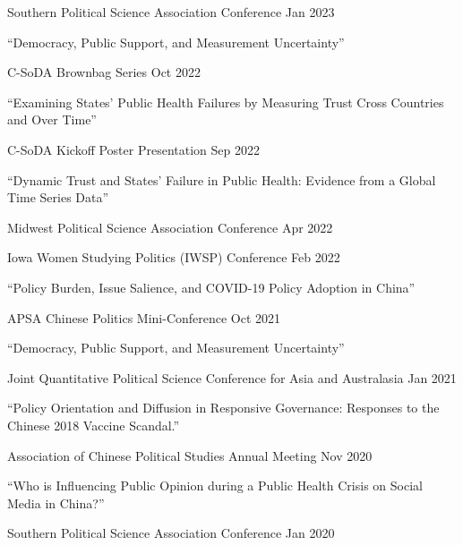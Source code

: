 \documentclass[10.5pt,]{article}
\providecommand{\tightlist}{%
	\setlength{\itemsep}{0pt}\setlength{\parskip}{0pt}}
\renewenvironment{itemize}{
	\begin{list}{}{
			\setlength{\leftmargin}{1.5em}
		}
	}{
	\end{list}
}
\begin{document}
\begin{itemize}
  \begin{itemize}
  \tightlist
  \item
    Southern Political Science Association Conference \hfill Jan 2023
  \end{itemize}
\item
  ``Democracy, Public Support, and Measurement Uncertainty''

  \begin{itemize}
  \tightlist
  \item
    C-SoDA Brownbag Series \hfill Oct 2022
  \end{itemize}
\item
  ``Examining States' Public Health Failures by Measuring Trust Cross
  Countries and Over Time''

  \begin{itemize}
  \tightlist
  \item
    C-SoDA Kickoff Poster Presentation \hfill Sep 2022
  \end{itemize}
\item
  ``Dynamic Trust and States' Failure in Public Health: Evidence from a
  Global Time Series Data''

  \begin{itemize}
  \tightlist
  \item
    Midwest Political Science Association Conference \hfill Apr 2022
  \item
    Iowa Women Studying Politics (IWSP) Conference \hfill Feb 2022
  \end{itemize}
\item
  ``Policy Burden, Issue Salience, and COVID-19 Policy Adoption in
  China''

  \begin{itemize}
  \tightlist
  \item
    APSA Chinese Politics Mini-Conference \hfill Oct 2021
  \end{itemize}
\item
  ``Democracy, Public Support, and Measurement Uncertainty''

  \begin{itemize}
  \tightlist
  \item
    Joint Quantitative Political Science Conference for Asia and
    Australasia \hfill Jan 2021
  \end{itemize}
\item
  ``Policy Orientation and Diffusion in Responsive Governance: Responses
  to the Chinese 2018 Vaccine Scandal.''

  \begin{itemize}
  \tightlist
  \item
    Association of Chinese Political Studies Annual Meeting \hfill Nov
    2020
  \end{itemize}
\item
  ``Who is Influencing Public Opinion during a Public Health Crisis on
  Social Media in China?''

  \begin{itemize}
  \tightlist
  \item
    Southern Political Science Association Conference \hfill  Jan 2020
  \end{itemize}
\end{itemize}
\end{document}
